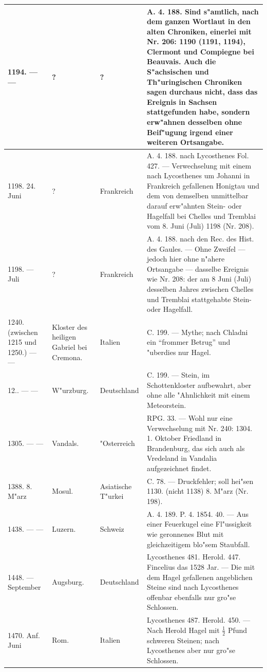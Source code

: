 \documentclass[a4paper, 8pt, oneside, polutonikogreek, german]{article}
\begin{document}
\begin{center}
\begin{longtable}{| p{20mm} | p{25mm} | p{20mm} | p{55mm} |}
        1194. --- --- & ? & ? & A. 4. 188. Sind s"amtlich, nach dem ganzen Wortlaut in den alten Chroniken, einerlei mit Nr. 206: 1190 (1191, 1194), Clermont und Compiegne bei Beauvais. Auch die S"achsischen und Th"uringischen Chroniken sagen durchaus nicht, dass das Ereignis in Sachsen stattgefunden habe, sondern erw"ahnen desselben ohne Beif"ugung irgend einer weiteren Ortsangabe. \\ \hline
        1198. 24. Juni & ? & Frankreich & A. 4. 188. nach Lycosthenes Fol. 427. --- Verwechselung mit einem nach Lycosthenes um Johanni in Frankreich gefallenen Honigtau und dem von demselben unmittelbar darauf erw"ahnten Stein- oder Hagelfall bei Chelles und Tremblai vom 8. Juni (Juli) 1198 (Nr. 208). \\ \hline
        1198. --- Juli & ? & Frankreich & A. 4. 188. nach den Rec. des Hist. des Gaules. --- Ohne Zweifel --- jedoch hier ohne n"ahere Ortsangabe --- dasselbe Ereignis wie Nr. 208: der am 8 Juni (Juli) desselben Jahres zwischen Chelles und Tremblai stattgehabte Stein- oder Hagelfall. \\ \hline
        1240. (zwischen 1215 und 1250.) --- --- & Kloster des heiligen Gabriel bei Cremona. & Italien & C. 199. --- Mythe; nach Chladni ein "`frommer Betrug"' und "uberdies nur Hagel. \\ \hline
        12.. --- --- & W"urzburg. & Deutschland & C. 199. --- Stein, im Schottenkloster aufbewahrt, aber ohne alle "Ahnlichkeit mit einem Meteorstein. \\ \hline
        1305. --- --- & Vandals. & "Osterreich & RPG. 33. --- Wohl nur eine Verwechselung mit Nr. 240: 1304. 1. Oktober Friedland in Brandenburg, das sich auch als Vredeland in Vandalia aufgezeichnet findet. \\ \hline
        1388. 8. M"arz & Mosul. & Asiatische T"urkei & C. 78. --- Druckfehler; soll hei"sen 1130. (nicht 1138) 8. M"arz (Nr. 198). \\ \hline
        1438. --- --- & Luzern. & Schweiz & A. 4. 189. P. 4. 1854. 40. --- Aus einer Feuerkugel eine Fl"ussigkeit wie geronnenes Blut mit gleichzeitigem blo"sem Staubfall. \\ \hline
        1448. --- September & Augsburg. & Deutschland & Lycosthenes 481. Herold. 447. Fincelius das 1528 Jar. --- Die mit dem Hagel gefallenen angeblichen Steine sind nach Lycosthenes offenbar ebenfalls nur gro"se Schlossen. \\ \hline
        1470. Anf. Juni & Rom. & Italien & Lycosthenes 487. Herold. 450. --- Nach Herold Hagel mit $\frac{1}{2}$ Pfund schweren Steinen; nach Lycosthenes aber nur gro"se Schlossen. \\ \hline

\end{longtable}
\end{center}
\end{document}
